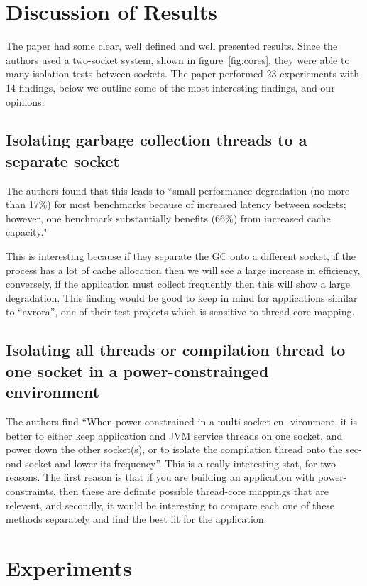 \documentclass[conference]{IEEEtran}
\begin{document}
\section{Discussion of Results}
The paper had some clear, well defined and well presented results.  Since the authors used a two-socket system, shown in figure~\ref{fig:cores}, they were able to many isolation tests between sockets.  The paper performed 23 experiements with 14 findings, below we outline some of the most interesting findings, and our opinions:

\subsection{Isolating garbage collection threads to a separate socket}
 
The authors found that this leads to ``small performance degradation (no more than 17\%) for most benchmarks because of increased latency between sockets; however, one benchmark substantially benefits (66\%) from increased cache capacity."

This is interesting because if they separate the GC onto a different socket, if the process has a lot of cache allocation then we will see a large increase in efficiency, conversely, if the application must collect frequently then this will show a large degradation.  This finding would be good to keep in mind for applications similar to ``avrora'', one of their test projects which is sensitive to thread-core mapping.

\subsection{Isolating all threads or compilation thread to one socket in a power-constrainged environment}

The authors find ``When power-constrained in a multi-socket en- vironment, it is better to either keep application and JVM service threads on one socket, and power down the other socket(s), or to isolate the compilation thread onto the sec- ond socket and lower its frequency''. This is a really interesting stat, for two reasons.  The first reason is that if you are building an application with power-constraints, then these are definite possible thread-core mappings that are relevent, and secondly, it would be interesting to compare each one of these methods separately and find the best fit for the application.  

\section{Experiments}
\end{document}
